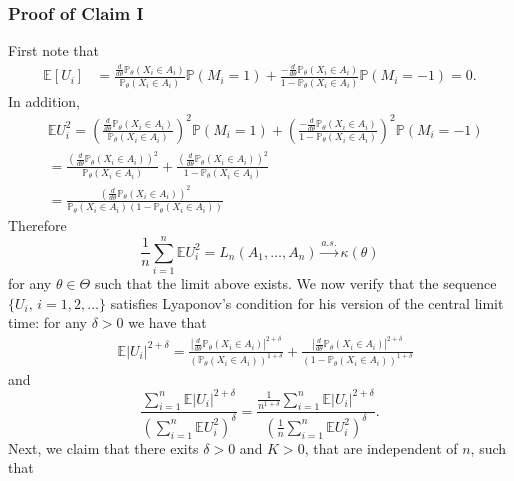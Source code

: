 \documentclass[letterpaper, 11pt]{IEEEtran}      %
\newcommand{\Prob}{\mathbb{P} }
\begin{document}
\subsubsection*{Proof of Claim I}
First note that 
\begin{align*}
\mathbb E  [U_i] & = 
 \frac{\frac{d}{d\theta} \Prob_{\theta}(X_i \in A_i)}{\Prob_{\theta}(X_i \in A_i)}   \Prob (M_i=1)   + 
 \frac{-\frac{d}{d\theta} \Prob_{\theta}(X_i \in A_i)}{1-\Prob_{\theta}(X_i \in A_i)}   \Prob (M_i=-1)  = 0. 
\end{align*}
In addition,
\begin{align*}
& \mathbb E U_i^2 = 
\left( \frac{\frac{d}{d\theta} \Prob_{\theta}(X_i \in A_i)}{\Prob_{\theta}(X_i \in A_i)}  \right)^2  \Prob (M_i=1)   + 
\left( \frac{-\frac{d}{d\theta} \Prob_{\theta}(X_i \in A_i)}{1-\Prob_{\theta}(X_i \in A_i)}  \right)^2 \Prob (M_i=-1) \\
& =
 \frac{ \left(\frac{d}{d\theta} \Prob_{\theta}(X_i \in A_i) \right)^2}{\Prob_{\theta}(X_i \in A_i)} +  
  \frac{ \left(\frac{d}{d\theta} \Prob_{\theta}(X_i \in A_i) \right)^2}{1-\Prob_{\theta}(X_i \in A_i)} \\
 & =  
  \frac{ \left(\frac{d}{d\theta} \Prob_{\theta}(X_i \in A_i) \right)^2}{\Prob_{\theta}(X_i \in A_i) \left(1-\Prob_{\theta}(X_i \in A_i) \right)} 
\end{align*}
Therefore
\[
\frac{1}{n} \sum_{i=1}^n \mathbb E U_i^2 = L_n(A_1,\ldots,A_n) \overset{a.s.}{\longrightarrow} \kappa(\theta)
\]
for any $\theta \in \Theta$ such that the limit above exists. We now verify that the sequence $\{ U_i,\,i=1,2,\ldots \}$ satisfies Lyaponov's condition for his version of the central limit time: for any $\delta>0$ we have that 
\begin{align*}
& \mathbb E \left| U_i \right|^{2+\delta} =
 \frac{ \left| \frac{d}{d\theta} \Prob_{\theta}(X_i \in A_i) \right|^{2+\delta}} {(\Prob_{\theta}(X_i \in A_i))^{1+\delta}} +  
  \frac{ \left|\frac{d}{d\theta} \Prob_{\theta}(X_i \in A_i) \right|^{2+\delta}} {(1-\Prob_{\theta}(X_i \in A_i))^{1+\delta}} 
\end{align*}
and
\begin{equation}
\frac{\sum_{i=1}^n \mathbb E \left| U_i \right|^{2+\delta} } { \left( \sum_{i=1}^n \mathbb E U_i^2  \right)^\delta} = 
\frac{ \frac{1}{n^{1+\delta}} \sum_{i=1}^n \mathbb E |U_i|^{2+\delta} }{ \left(\frac{1}{n} \sum_{i=1}^n \mathbb E U_i^2  \right)^\delta}. 
\label{eq:Lyaponov}
\end{equation}
Next, we claim that there exits $\delta>0$ and $K>0$, that are independent of $n$, such that
\end{document}
